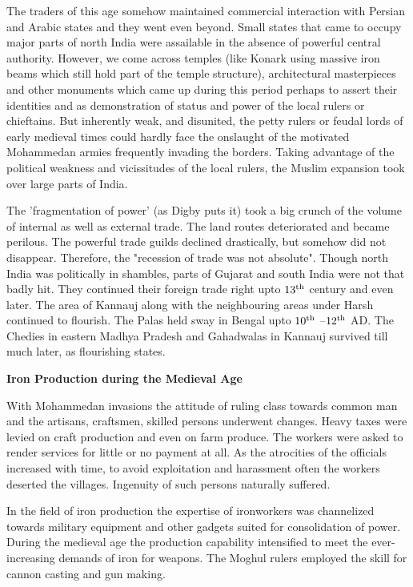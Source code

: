 The traders of this age somehow maintained commercial interaction with Persian and Arabic states and they went even beyond. Small states that came to occupy major parts of north India were assailable in the absence of powerful central authority. However, we come across temples (like Konark using massive iron beams which still hold part of the temple structure), architectural masterpieces and other monuments which came up during this period perhaps to assert their identities and as demonstration of status and power of the local rulers or chieftains. But inherently weak, and disunited, the petty rulers or feudal lords of early medieval times could hardly face the onslaught of the motivated Mohammedan armies frequently invading the borders. Taking advantage of the political weakness and vicissitudes of the local rulers, the Muslim expansion took over large parts of India. 

The 'fragmentation of power' (as Digby puts it) took a big crunch of the volume of internal as well as external trade. The land routes deteriorated and became perilous. The powerful trade guilds declined drastically, but somehow did not disappear. Therefore, the "recession of trade was not absolute". Though north India was politically in shambles, parts of Gujarat and south India were not that badly hit. They continued their foreign trade right upto $13^{\rm th}$ century and even later. The area of Kannauj along with the neighbouring areas under Harsh continued to flourish. The Palas held sway in Bengal upto $10^{\rm th}$ –$12^{\rm th}$ AD. The Chedies in eastern Madhya Pradesh and Gahadwalas in Kannauj survived till much later, as flourishing states.

\noindent \textbf{\large Iron Production during the Medieval Age}

With Mohammedan invasions the attitude of ruling class towards common man and the artisans, craftsmen, skilled persons underwent changes. Heavy taxes were levied on craft production and even on farm produce. The workers were asked to render services for little or no payment at all. As the atrocities of the officials increased with time, to avoid exploitation and harassment often the workers deserted the villages. Ingenuity of such persons naturally suffered. 

In the field of iron production the expertise of ironworkers was channelized towards military equipment and other gadgets suited for consolidation of power. During the medieval age the production capability intensified to meet the ever-increasing demands of iron for weapons. The Moghul rulers employed the skill for cannon casting and gun making.

